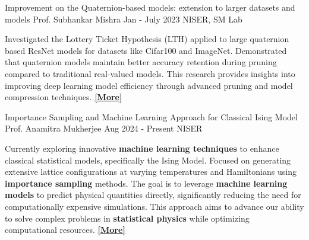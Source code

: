 \cvevent
    {Improvement on the Quaternion-based models: extension to larger datasets and models}  %
    {Prof. Subhankar Mishra}  %
    {Jan - July 2023}  %
    {NISER, SM Lab}  %
    \begin{justify}
        Investigated the Lottery Ticket Hypothesis (LTH) applied to large quaternion based ResNet models for datasets like Cifar100 and ImageNet. Demonstrated that quaternion models maintain better accuracy retention during pruning compared to traditional real-valued models. This research provides insights into improving deep learning model efficiency through advanced pruning and model compression techniques.  
        \href{https://github.com/smlab-niser/quatLT23}{\textbf{[More]}}
    \end{justify}
    \divider


\cvevent
    {Importance Sampling and Machine Learning Approach for Classical Ising Model}  %
    {Prof. Anamitra Mukherjee}  %
    {Aug 2024 - Present}  %
    {NISER}  %
    \begin{justify}
        Currently exploring innovative \textbf{machine learning techniques} to enhance classical statistical models, specifically the Ising Model. Focused on generating extensive lattice configurations at varying temperatures and Hamiltonians using \textbf{importance sampling} methods. The goal is to leverage \textbf{machine learning models} to predict physical quantities directly, significantly reducing the need for computationally expensive simulations. This approach aims to advance our ability to solve complex problems in \textbf{statistical physics} while optimizing computational resources.  
        \href{https://sites.google.com/site/workpagetemp/group-members}{\textbf{[More]}}
    \end{justify}
    \divider


